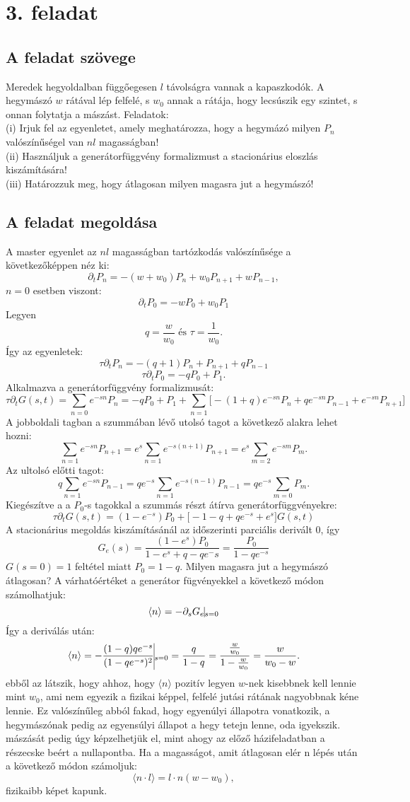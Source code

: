 \documentclass[12pt]{article}
\begin{document}
\newpage
\section*{3. feladat}
\subsection*{A feladat szövege}
Meredek hegyoldalban függőegesen $l$ távolságra vannak a kapaszkodók. A hegymászó $w$ rátával lép felfelé, s $w_0$ annak a rátája, hogy lecsúszik egy szintet, s onnan folytatja a mászást.
Feladatok:\\
(i) Irjuk fel az egyenletet, amely meghatározza, hogy a hegymázó milyen $P_n$ valószínűségel van $nl$ magasságban!\\
(ii) Használjuk a generátorfüggvény formalizmust a stacionárius eloszlás kiszámítására!\\
 (iii) Határozzuk meg, hogy átlagosan milyen magasra jut a hegymászó!
\subsection*{A feladat megoldása}
A master egyenlet az $nl$ magasságban tartózkodás valószínűsége  a következőképpen néz ki:
$$ \partial_tP_n = -(w + w_0)P_n + w_0P_{n+1} + wP_{n-1},$$
$n = 0$ esetben viszont:
$$\partial_t P_0 = -wP_0 + w_0P_1$$
Legyen
$$q = \frac{w}{w_0} \text{ és } \tau = \frac{1}{w_0} .$$
Így az egyenletek:
$$\tau \partial_t P_n = -(q+1)P_n + P_{n+1} + qP_{n-1}$$
$$ \tau \partial_t P_0 = -qP_0 + P_1.$$
Alkalmazva a generátorfüggvény formalizmusát:
$$\tau \partial _t G(s, t ) = \sum_{n = 0}e^{-sn}P_n = -qP_0 + P_1 + \sum_{n =1}\big [-(1+q)e^{-sn}P_n + qe^{-sn}P_{n-1} + e^{-sn}P_{n+1}\big]$$
A jobboldali tagban a szummában lévő utolsó tagot a következő alakra lehet hozni:
$$\sum_{n =1}e^{-sn}P_{n+1} = e^s\sum_{n = 1}e^{-s(n+1)}P_{n+1}= e^s\sum_{m = 2}e^{-sm}P_m. $$
Az ultolsó előtti tagot:
$$q\sum_{n = 1}e^{-sn}P_{n-1} = qe^{-s}\sum_{n = 1} e^{-s(n-1)}P_{n-1} = qe^{-s}\sum_{m =0}  P_m.$$
Kiegészítve a a $P_0$-s tagokkal a szummás részt átírva generátorfüggvényekre:
$$\tau \partial_tG(s,t) = (1-e^{-s})P_0+ \big [-1-q+qe^{-s}+ e^s\big ]G(s,t)$$
A stacionárius megoldás kiszámításánál az időszerinti parciális derivált 0, így 
$$G_e(s) = \frac{(1-e^s)P_0}{1-e^s+q-qe^-s} = \frac{P_0}{1-qe^{-s}}$$
$G(s = 0) = 1$ feltétel miatt $P_0 = 1-q.$  Milyen magasra jut a hegymászó átlagosan? A várhatóértéket a generátor fügvényekkel a következő módon számolhatjuk:
$$\langle n \rangle = -\partial_s G_e\vline_{s = 0}$$
Így a deriválás után:
$$\langle n\rangle = -\frac{(1-q)qe^{-s}}{(1-qe^{-s})^2}\vline_{s=0} = \frac{q}{1-q} = \frac{\frac{w}{w_0}}{1-\frac{w}{w_0}}= \frac{w}{w_0-w}.$$
ebből az látszik, hogy ahhoz, hogy $\langle n \rangle$ pozitív legyen  $w$-nek kisebbnek kell lennie mint $w_0$, ami nem egyezik a fizikai képpel, felfelé jutási rátának nagyobbnak kéne lennie. Ez valószínűleg abból fakad, hogy egyenúlyi állapotra vonatkozik, a hegymászónak pedig az egyensúlyi állapot a hegy tetejn lenne, oda igyekszik. mászását pedig úgy képzelhetjük el, mint ahogy az előző házifeladatban a részecske beért a nullapontba. Ha a magasságot, amit átlagosan elér n lépés után a következő módon számoljuk:
$$\langle n\cdot l \rangle = l\cdot n (w-w_0),$$
fizikaibb képet kapunk.
\end{document}
